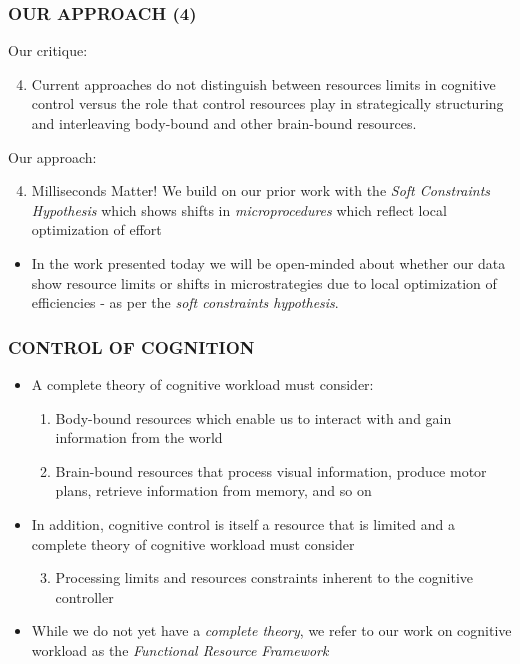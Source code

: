 \documentclass{beamer}
\begin{document}
\begin{frame}
	\frametitle{OUR APPROACH (4)}
Our critique:
	\begin{enumerate}
		\setcounter{enumi}{3}
		\item Current approaches do not distinguish between resources limits in cognitive control versus the role that control resources play in strategically structuring and interleaving body-bound and other brain-bound resources.
	\end{enumerate}
\pause
Our approach: 
	\begin{enumerate}
		\setcounter{enumi}{3}
		\item \alert{Milliseconds Matter!} We build on our prior work with the \emph{Soft Constraints Hypothesis} \parencite{gray06pr} which shows shifts in \emph{microprocedures} which reflect local optimization of effort
	\end{enumerate}
	\begin{itemize}
			\item In the work presented today we will be open-minded about whether our data show \alert{resource limits} or \alert{shifts in microstrategies} due to local optimization of efficiencies - as per the \emph{soft constraints hypothesis}.
		\end{itemize}

\end{frame}

\begin{frame}
	\frametitle{CONTROL OF COGNITION}
	\begin{itemize}
		\item A complete theory of cognitive workload must consider: 
		\begin{enumerate}
			\item Body-bound resources which enable us to interact with and gain information from the world
			\item Brain-bound resources that process visual information, produce motor plans, retrieve information from memory, and so on
		\end{enumerate}
		\pause
		\item In addition, cognitive control is itself a resource that is limited and a complete theory of cognitive workload must consider
		\begin{enumerate}
			\setcounter{enumi}{2}
			\item Processing limits and resources constraints inherent to the cognitive controller
		\end{enumerate}
		\pause
		\item While we do not yet have a \emph{complete theory}, we refer to our work on cognitive workload as the \emph{Functional Resource Framework}
	\end{itemize}

\end{frame}
\end{document}
